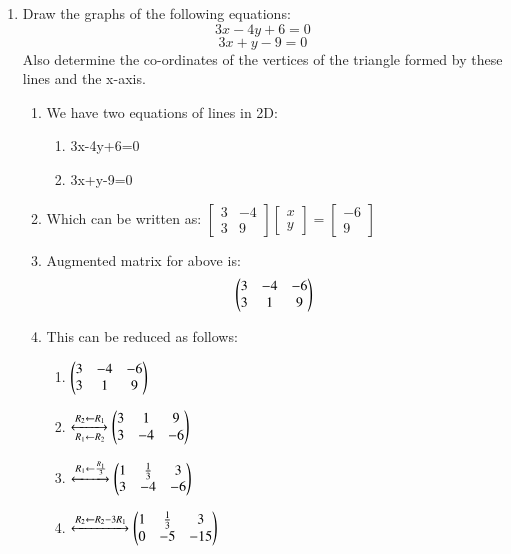 \documentclass[journal,12pt,twocolumn]{IEEEtran}
\renewcommand\thesection{\arabic{section}}
\begin{document}
\begin{enumerate}[label=\thesection.\arabic*.,ref=\thesection.\theenumi]
\item Draw the graphs of the following equations: 
$$ 3x-4y+6=0 $$
$$ 3x+y-9=0 $$
Also determine the co-ordinates of the vertices of the triangle formed by these lines and the x-axis.
\solution\\
\begin{enumerate}
    \item We have two equations of lines in 2D:
\begin{enumerate}
    \item 3x-4y+6=0\\
    \item 3x+y-9=0 
\end{enumerate}
\item Which can be written as:
$
\begin{bmatrix}
  3 & -4 \\ 3 & 9
\end{bmatrix}
\begin{bmatrix}
  x \\ y
\end{bmatrix}
=
\begin{bmatrix}
  -6 \\ 9
\end{bmatrix}
$
\item Augmented matrix for above is:
\begin{align}
    \begin{pmatrix}3 & -4 & -6\\
           3 & 1 & 9\end{pmatrix}
\end{align}
\item This can be reduced as follows:
\begin{enumerate}
    \item $\begin{pmatrix}3 & -4 & -6\\
           3 & 1 & 9\end{pmatrix}$
    \item $\xleftrightarrow[R_1 \leftarrow R_2]
    {R_2 \leftarrow R_1}
    \begin{pmatrix}3 & 1 & 9\\
          3 & -4 & -6\end{pmatrix}\\$
          \item $\xleftrightarrow{R_1 \leftarrow \frac{R_1}{3}}
    \begin{pmatrix}1 &\frac{1}{3}&3\\
        3&-4&-6\end{pmatrix}\\$
        \item $\xleftrightarrow{R_2\leftarrow R_2-3R_1}
    \begin{pmatrix}1&\frac{1}{3}&3\\0&-5&-15\end{pmatrix}\\$

\end{enumerate}
\end{enumerate}
\end{enumerate}
\end{document}
